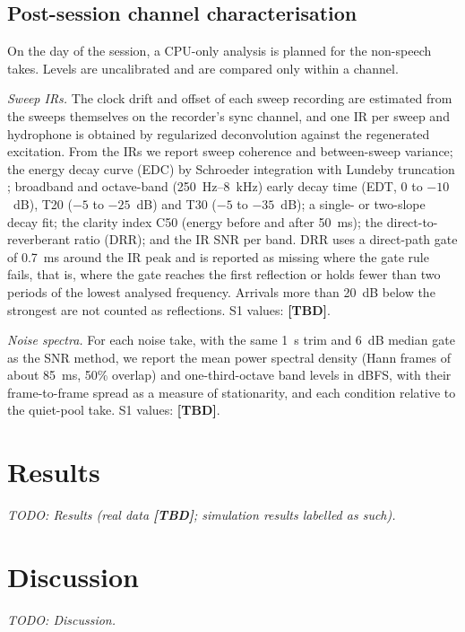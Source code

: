 \documentclass[conference]{IEEEtran}
\newcommand{\tbd}{\textbf{[TBD]}}
\begin{document}
\subsection{Post-session channel characterisation}
\label{sec:post}
On the day of the session, a CPU-only analysis is planned for the non-speech takes. Levels are
uncalibrated and are compared only within a channel.

\textit{Sweep IRs.} The clock drift and offset of each sweep recording are estimated from the sweeps
themselves on the recorder's sync channel, and one IR per sweep and hydrophone is obtained by
regularized deconvolution against the regenerated excitation. From the IRs we report sweep coherence
and between-sweep variance; the energy decay curve (EDC) by Schroeder integration with Lundeby
truncation \cite{schroeder1965,lundeby1995}; broadband and octave-band
(250~Hz--8~kHz) early decay time (EDT, 0 to $-10$~dB), T20 ($-5$ to $-25$~dB) and T30 ($-5$ to
$-35$~dB); a single- or two-slope decay fit; the clarity index C50 (energy before and after 50~ms);
the direct-to-reverberant ratio (DRR); and the IR SNR per band. DRR uses a direct-path gate of 0.7~ms
around the IR peak and is reported as missing where the gate rule fails, that is, where the gate reaches
the first reflection or holds fewer than two periods of the lowest analysed frequency. Arrivals more
than 20~dB below the strongest are not counted as reflections. S1 values: \tbd.

\textit{Noise spectra.} For each noise take, with the same 1~s trim and 6~dB median gate as the SNR
method, we report the mean power spectral density (Hann frames of about 85~ms, 50\% overlap) and
one-third-octave band levels in dBFS, with their frame-to-frame spread as a measure of stationarity,
and each condition relative to the quiet-pool take. S1 values: \tbd.

\fi

\section{Results}
\textit{TODO: Results (real data \tbd; simulation results labelled as such).}

\section{Discussion}
\textit{TODO: Discussion.}
\end{document}
